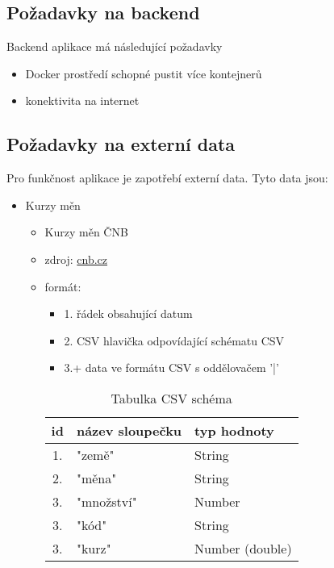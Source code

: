 \documentclass[FM,SP]{tulthesis}
\begin{document}
\subsection{Požadavky na backend}
Backend aplikace má následující požadavky
\begin{itemize}
    \item Docker prostředí schopné pustit více kontejnerů
    \item konektivita na internet
\end{itemize}

\subsection{Požadavky na externí data}
Pro funkčnost aplikace je zapotřebí externí data.
Tyto data jsou:

\begin{itemize}
    \item Kurzy měn
          \begin{itemize}
              \item Kurzy měn ČNB
              \item zdroj: \href{https://www.cnb.cz/cs/financni_trhy/devizovy_trh/kurzy_devizoveho_trhu/denni_kurz.txt}{cnb.cz}
              \item formát:
                    \begin{itemize}
                        \item 1. řádek obsahující datum
                        \item 2. CSV hlavička odpovídající schématu CSV
                        \item 3.+ data ve formátu CSV s oddělovačem '|'

                    \end{itemize}
                    \begin{table}[h!]
                        \centering
                        \begin{tabular}{ |c|l|l| }
                            \hline
                            id & název sloupečku & typ hodnoty     \\
                            \hline
                            1. & "země"          & String          \\
                            2. & "měna"          & String          \\
                            3. & "množství"      & Number          \\
                            3. & "kód"           & String          \\
                            3. & "kurz"          & Number (double) \\
                            \hline
                        \end{tabular}
                        \caption{Tabulka CSV schéma}
                    \end{table}
          \end{itemize}
\end{itemize}
\end{document}
